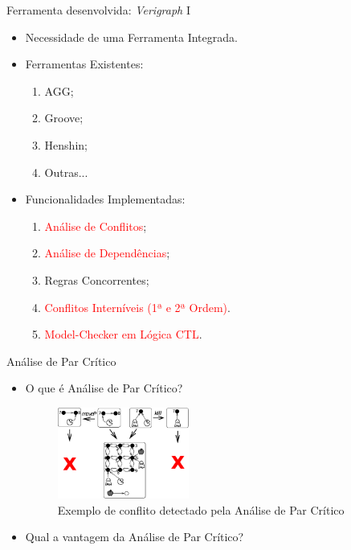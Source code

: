\documentclass[xcolor=dvipsnames,pdf,10pt]{beamer}
\newcommand{\bi}{\begin{itemize}}
\newcommand{\ei}{\end{itemize}}
\newcommand{\be}{\begin{enumerate}}
\newcommand{\ee}{\end{enumerate}}
\newcommand{\tm}{\item}
\begin{document}

\begin{frame}{Ferramenta desenvolvida: \emph{Verigraph} I}

\hfill
\bi

    \tm Necessidade de uma Ferramenta Integrada. \\ 

    \vspace{0.25cm}
    \tm Ferramentas Existentes: \\
        \be
            \tm AGG;
            \tm Groove;
            \tm Henshin;
            \tm Outras...
        \ee

    \vspace{0.25cm}
    \tm Funcionalidades Implementadas: \\
        \be
            \tm \textcolor{red}{Análise de Conflitos};
            \tm \textcolor{red}{Análise de Dependências};
            \tm Regras Concorrentes;
            \tm \textcolor{red}{Conflitos Interníveis (1ª e 2ª Ordem)}.
            \tm \textcolor{red}{Model-Checker em Lógica CTL}.
        \ee
    \ei

\end{frame}


\begin{frame}{Análise de Par Crítico}

\bi
    \tm O que é Análise de Par Crítico? \\
        \vspace{0.15cm}
        \begin{figure}
            \centering \includegraphics[height=3cm, keepaspectratio]{./pacman/ex_conflito.eps}
            \caption{Exemplo de conflito detectado pela Análise de Par Crítico}
        \end{figure}
        
    \vspace{0.5cm}
    \tm Qual a vantagem da Análise de Par Crítico?
    
\ei 

\end{frame}    
\end{document}

